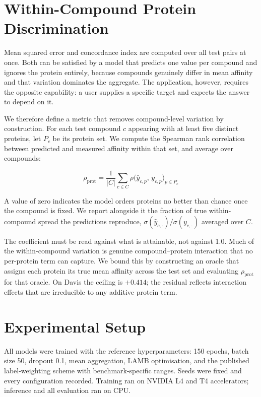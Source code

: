 \documentclass[conference]{IEEEtran}
\begin{document}
\section{Within-Compound Protein Discrimination}\label{sec:metric}

Mean squared error and concordance index are computed over all test pairs at once. Both can be
satisfied by a model that predicts one value per compound and ignores the protein entirely, because
compounds genuinely differ in mean affinity and that variation dominates the aggregate. The
application, however, requires the opposite capability: a user supplies a specific target and
expects the answer to depend on it.

We therefore define a metric that removes compound-level variation by construction. For each test
compound $c$ appearing with at least five distinct proteins, let $P_c$ be its protein set. We
compute the Spearman rank correlation between predicted and measured affinity within that set, and
average over compounds:

\begin{equation}
\rho_{\mathrm{prot}} = \frac{1}{|C|}\sum_{c \in C}
  \rho\big(\hat{y}_{c,p},\, y_{c,p}\big)_{p \in P_c}
\end{equation}

A value of zero indicates the model orders proteins no better than chance once the compound is
fixed. We report alongside it the fraction of true within-compound spread the predictions reproduce,
$\sigma(\hat{y}_{c,\cdot}) / \sigma(y_{c,\cdot})$ averaged over $C$.

The coefficient must be read against what is attainable, not against 1.0. Much of the within-compound
variation is genuine compound--protein interaction that no per-protein term can capture. We bound
this by constructing an oracle that assigns each protein its true mean affinity across the test set
and evaluating $\rho_{\mathrm{prot}}$ for that oracle. On Davis the ceiling is $+0.414$; the
residual reflects interaction effects that are irreducible to any additive protein term.

\section{Experimental Setup}

All models were trained with the reference hyperparameters: 150 epochs, batch size 50, dropout 0.1,
mean aggregation, LAMB optimisation, and the published label-weighting scheme with benchmark-specific
ranges. Seeds were fixed and every configuration recorded. Training ran on NVIDIA L4 and T4
accelerators; inference and all evaluation ran on CPU.
\end{document}
